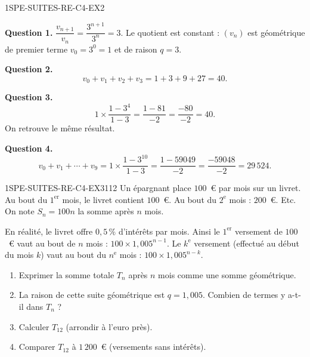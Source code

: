 
\begin{corrige}{1SPE-SUITES-RE-C4-EX2}


\textbf{Question 1.} $\dfrac{v_{n+1}}{v_n} = \dfrac{3^{n+1}}{3^n} = 3$. Le quotient est constant : $(v_n)$ est géométrique de premier terme $v_0 = 3^0 = 1$ et de raison $q = 3$.

\textbf{Question 2.}
\[
v_0 + v_1 + v_2 + v_3 = 1 + 3 + 9 + 27 = 40.
\]


\textbf{Question 3.}
\[
1 \times \frac{1 - 3^4}{1 - 3} = \frac{1 - 81}{-2} = \frac{-80}{-2} = 40.
\]
On retrouve le même résultat. \checkmark

\textbf{Question 4.}
\[
v_0 + v_1 + \cdots + v_9 = 1 \times \frac{1 - 3^{10}}{1 - 3} = \frac{1 - 59049}{-2} = \frac{-59048}{-2} = 29\,524.
\]

\end{corrige}


\begin{exercice}{1SPE-SUITES-RE-C4-EX3}{1}{12}
Un épargnant place $100$~€ par mois sur un livret. Au bout du $1^{\text{er}}$ mois, le livret contient $100$~€. Au bout du $2^{\text{e}}$ mois : $200$~€. Etc. On note $S_n = 100n$ la somme après $n$ mois.

En réalité, le livret offre $0{,}5\,\%$ d'intérêts par mois. Ainsi le $1^{\text{er}}$ versement de $100$~€ vaut au bout de $n$ mois : $100 \times 1{,}005^{n-1}$. Le $k^{\text{e}}$ versement (effectué au début du mois $k$) vaut au bout du $n^{\text{e}}$ mois : $100 \times 1{,}005^{n-k}$.
\begin{enumerate}
  \item Exprimer la somme totale $T_n$ après $n$ mois comme une somme géométrique.
  \item La raison de cette suite géométrique est $q = 1{,}005$. Combien de termes y a-t-il dans $T_n$ ?
  \item Calculer $T_{12}$ (arrondir à l'euro près).
  \item Comparer $T_{12}$ à $1\,200$~€ (versements sans intérêts).
\end{enumerate}
\end{exercice}

